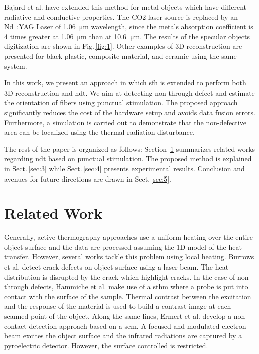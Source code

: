 \documentclass[12pt]{spieman}
\begin{document}
\begin{spacing}{2}
Bajard et al.\cite{Bajard2012} have extended this method for metal objects which have different radiative and conductive properties. The CO2 laser source is replaced by an Nd~:YAG Laser of \SI{1.06}{\micro \metre} wavelength, since the metals absorption coefficient is 4 times greater at \SI{1.06}{\micro \metre} than at \SI{10.6}{\micro \metre}. The results of the specular objects digitization are shown in Fig.\,\ref{fig:1}. Other examples of 3D reconstruction are presented for black plastic, composite material, and ceramic using the same system.

In this work, we present an approach in which \ac{sfh} is extended to perform both 3D reconstruction and \ac{ndt}. We aim at detecting non-through defect and estimate the orientation of fibers using punctual stimulation. The proposed approach significantly reduces the cost of the hardware setup and avoids data fusion errors. Furthermore, a simulation is carried out to demonstrate that the non-defective area can be localized using the thermal radiation disturbance.

The rest of the paper is organized as follows: Section~\ref{sec:2} summarizes related works regarding \ac{ndt} based on punctual stimulation. The proposed method is explained in Sect.\,\ref{sec:3} while Sect.\,\ref{sec:4} presents experimental results. Conclusion and avenues for future directions are drawn in Sect.\,\ref{sec:5}.




% 

\section{Related Work}\label{sec:2}

Generally, active thermography approaches use a uniform heating over the entire object-surface and the data are processed assuming the 1D model of the heat transfer. However, several works tackle this problem using local heating.
Burrows et al.\cite{Burrows2011} detect crack defects on object surface using a laser beam. The heat distribution is disrupted by the crack which highlight cracks.
In the case of non-through defects, Hammiche et al.\cite{Hammiche1996} make use of a \ac{sthm} where a probe is put into contact with the surface of the sample. Thermal contrast between the excitation and the response of the material is used to build a contrast image at each scanned point of the object.
Along the same lines, Ermert et al.\cite{Ermert1984} develop a non-contact detection approach based on a \ac{sem}. A focused and modulated electron beam excites the object surface and the infrared radiations are captured by a pyroelectric detector. However, the surface controlled is restricted.


\end{spacing}
\end{document}
